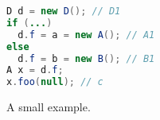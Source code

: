 \begin{comment}
we  \cite{sridharan2005demand, sridharan2006refinement} initiate an additional algorithm to compute which objects are pointed by \texttt{x} under context [\texttt{c2}] and eliminate the remaining part, i.e., $\xrightarrow[\hat{\mathtt{c3}}]{\assign} \mathtt{p} \xrightarrow{\load[f]} \mathtt{v}$, of \Cref{eq:LFCPathCGPreciseII} due to $\pointsto{\csabstraction{\mathtt{x}}{[\mathtt{c2}]}} = \{\csabstraction{{\color{purple} \mathtt{B}}}{\emptyctx}\}$ (\Cref{table:kcfaresults}).  


\begin{equation*}
  \centering
\begin{tabular}{l}\scriptsize
\commentfont{O2}$\xrightarrow{\new}
\texttt{o2}\xrightarrow[\hat{\mathtt{c2}}]{\assign}
\texttt{o} \xrightarrow{\storefield{f}} \texttt{d}
\xrightarrow{\inew}$ \commentfont{D} 
$ \xrightarrow{\new} \texttt{d}
$
\end{tabular}
\end{equation*}
\end{comment}


\begin{figure}[h]
\begin{center}
\begin{mdframed}[
align=center,
usetwoside=false,
 rightmargin=8.5cm,
innerleftmargin=4.0ex,
innertopmargin=0.2ex,
innerbottommargin=0.2ex
]
\begin{lrbox}{\mybox}
\begin{lstlisting}[language=java, numbers=none, otherkeywords = {null}]
D d = new D(); // D1
if (...)
  d.f = a = new A(); // A1 
else
  d.f = b = new B(); // B1
A x = d.f;
x.foo(null); // c
\end{lstlisting}
\end{lrbox}
\scalebox{1}{\usebox{\mybox}}
\end{mdframed}
\end{center}
\caption{A small example.
\label{fig:recvobj}}
\end{figure}

